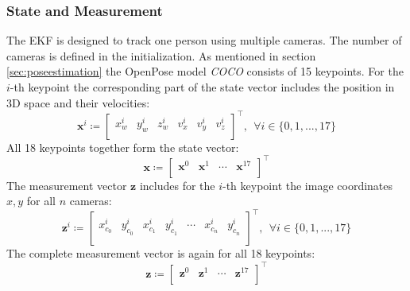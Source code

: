 \subsubsection{State and Measurement}
The EKF is designed to track one person using multiple cameras. The number of cameras is defined in the initialization. As mentioned in section \ref{sec:poseestimation} the OpenPose model \textit{COCO} consists of 15 keypoints. For the $i$-th keypoint the corresponding part of the state vector includes the position in 3D space and their velocities:
\begin{equation}
\mathbf{x}^i \coloneqq 
\begin{bmatrix}
x^i_{w} & y^i_{w} & z^i_{w} & v^i_{x} & v^i_{y} & v^i_{z}\\
\end{bmatrix}^\intercal,   \ \ \forall i \in \{0,1,...,17\}
\end{equation}
All 18 keypoints together form the state vector:
\begin{equation}
\mathbf{x} \coloneqq 
\begin{bmatrix}
\mathbf{x}^0 & \mathbf{x}^1 & \cdots & \mathbf{x}^{17}\\
\end{bmatrix}^\intercal
\end{equation}
The measurement vector $\mathbf{z}$ includes for the $i$-th keypoint the image coordinates $x, y$ for all $n$ cameras:
\begin{equation}
\mathbf{z}^i \coloneqq 
\begin{bmatrix}
x^i_{c_0} & y^i_{c_0} & x^i_{c_1} & y^i_{c_1} & \cdots & x^i_{c_n} & y^i_{c_n}\\
\end{bmatrix}^\intercal, \ \ \forall i \in \{0,1,...,17\}
\end{equation}
The complete measurement vector is again for all 18 keypoints:
\begin{equation}
\mathbf{z} \coloneqq 
\begin{bmatrix}
\mathbf{z}^0 & \mathbf{z}^1 & \cdots & \mathbf{z}^{17}\\
\end{bmatrix}^\intercal
\end{equation}

